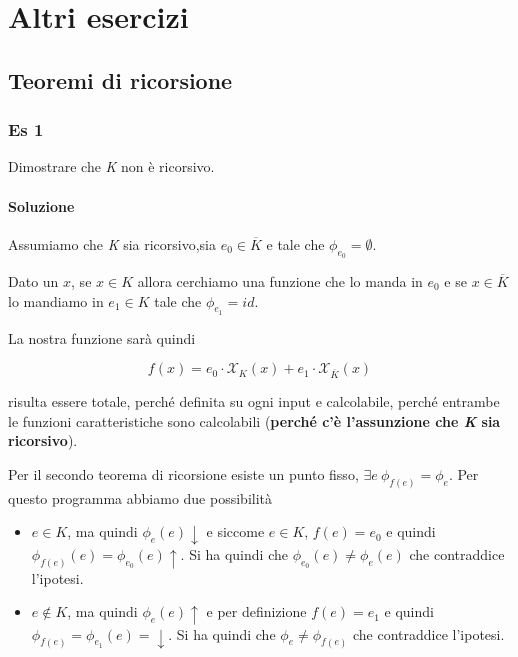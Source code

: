 
\chapter{Altri esercizi}

\section{Teoremi di ricorsione}

\subsection{Es 1}

Dimostrare che \textit{K} non è ricorsivo.

\subsubsection{Soluzione}

Assumiamo che \textit{K} sia ricorsivo,sia $e_0 \in \overline{K}$ e tale che $\phi_{e_0} = \emptyset$.

Dato un $x$, se $x \in K$ allora cerchiamo una funzione che lo manda in $e_0$ e se $x \in \overline{K}$ lo mandiamo in $e_1 \in K$ tale che $\phi_{e_1} = id$.

La nostra funzione sarà quindi 

$$
f(x) = e_0 \cdot \mathcal{X}_{K}(x) + e_1 \cdot \mathcal{X}_{\overline{K}}(x)
$$

risulta essere totale, perché definita su ogni input e calcolabile, perché entrambe le funzioni caratteristiche sono calcolabili (\textbf{perché c'è l'assunzione che \textit{K} sia ricorsivo}).

Per il secondo teorema di ricorsione esiste un punto fisso, $\exists e \: \phi_{f(e)} = \phi_e$.
Per questo programma abbiamo due possibilità

\begin{itemize}
	\item $e \in K$, ma quindi $\phi_{e}(e) \downarrow$ e siccome $e \in K$, $f(e) = e_0$ e quindi $\phi_{f(e)}(e) = \phi_{e_0}(e) \uparrow$. Si ha quindi che $ \phi_{e_0}(e) \neq \phi_{e}(e)$ che contraddice l'ipotesi.
	\item $e \notin K$, ma quindi $\phi_{e}(e) \uparrow$ e per definizione $f(e) = e_1$ e quindi $\phi_{f(e)} = \phi_{e_1}(e) = \downarrow$. Si ha quindi che $\phi_e \neq \phi_{f(e)}$ che contraddice l'ipotesi.
\end{itemize}

